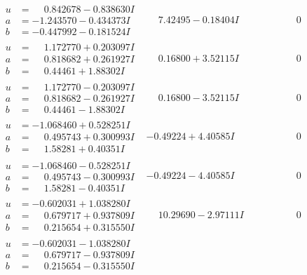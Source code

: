 \documentclass[1p]{elsarticle_modified}
\theoremstyle{definition}
\begin{document}
$$\begin{array}{c|c|c}
\begin{aligned}
u &= \phantom{-}0.842678 - 0.838630 I \\
a &= -1.243570 - 0.434373 I \\
b &= -0.447992 - 0.181524 I\end{aligned}
 & \phantom{-}7.42495 - 0.18404 I & \phantom{-0.000000 } 0 \\ \hline\begin{aligned}
u &= \phantom{-}1.172770 + 0.203097 I \\
a &= \phantom{-}0.818682 + 0.261927 I \\
b &= \phantom{-}0.44461 + 1.88302 I\end{aligned}
 & \phantom{-}0.16800 + 3.52115 I & \phantom{-0.000000 } 0 \\ \hline\begin{aligned}
u &= \phantom{-}1.172770 - 0.203097 I \\
a &= \phantom{-}0.818682 - 0.261927 I \\
b &= \phantom{-}0.44461 - 1.88302 I\end{aligned}
 & \phantom{-}0.16800 - 3.52115 I & \phantom{-0.000000 } 0 \\ \hline\begin{aligned}
u &= -1.068460 + 0.528251 I \\
a &= \phantom{-}0.495743 + 0.300993 I \\
b &= \phantom{-}1.58281 + 0.40351 I\end{aligned}
 & -0.49224 + 4.40585 I & \phantom{-0.000000 } 0 \\ \hline\begin{aligned}
u &= -1.068460 - 0.528251 I \\
a &= \phantom{-}0.495743 - 0.300993 I \\
b &= \phantom{-}1.58281 - 0.40351 I\end{aligned}
 & -0.49224 - 4.40585 I & \phantom{-0.000000 } 0 \\ \hline\begin{aligned}
u &= -0.602031 + 1.038280 I \\
a &= \phantom{-}0.679717 + 0.937809 I \\
b &= \phantom{-}0.215654 + 0.315550 I\end{aligned}
 & \phantom{-}10.29690 - 2.97111 I & \phantom{-0.000000 } 0 \\ \hline\begin{aligned}
u &= -0.602031 - 1.038280 I \\
a &= \phantom{-}0.679717 - 0.937809 I \\
b &= \phantom{-}0.215654 - 0.315550 I\end{aligned}

\end{array}$$
\end{document}
